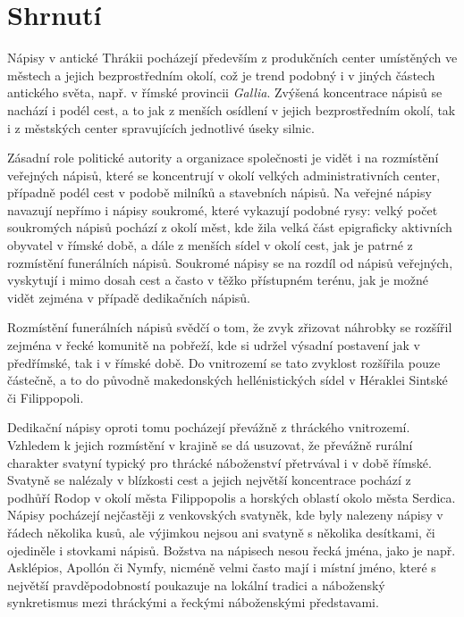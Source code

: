 \section[shrnutí-25]{Shrnutí}

Nápisy v antické Thrákii pocházejí především z produkčních center umístěných ve městech a jejich bezprostředním okolí, což je trend podobný i v jiných částech antického světa, např. v římské provincii {\em Gallia}. Zvýšená koncentrace nápisů se nachází i podél cest, a to jak z menších osídlení v jejich bezprostředním okolí, tak i z městských center spravujících jednotlivé úseky silnic.

Zásadní role politické autority a organizace společnosti je vidět i na rozmístění veřejných nápisů, které se koncentrují v okolí velkých administrativních center, případně podél cest v podobě milníků a stavebních nápisů. Na veřejné nápisy navazují nepřímo i nápisy soukromé, které vykazují podobné rysy: velký počet soukromých nápisů pochází z okolí měst, kde žila velká část epigraficky aktivních obyvatel v římské době, a dále z menších sídel v okolí cest, jak je patrné z rozmístění funerálních nápisů. Soukromé nápisy se na rozdíl od nápisů veřejných, vyskytují i mimo dosah cest a často v těžko přístupném terénu, jak je možné vidět zejména v případě dedikačních nápisů.

Rozmístění funerálních nápisů svědčí o tom, že zvyk zřizovat náhrobky se rozšířil zejména v řecké komunitě na pobřeží, kde si udržel výsadní postavení jak v předřímské, tak i v římské době. Do vnitrozemí se tato zvyklost rozšířila pouze částečně, a to do původně makedonských hellénistických sídel v Héraklei Sintské či Filippopoli.

Dedikační nápisy oproti tomu pocházejí převážně z thráckého vnitrozemí. Vzhledem k jejich rozmístění v krajině se dá usuzovat, že převážně rurální charakter svatyní typický pro thrácké náboženství přetrvával i v době římské. Svatyně se nalézaly v blízkosti cest a jejich největší koncentrace pochází z podhůří Rodop v okolí města Filippopolis a horských oblastí okolo města Serdica. Nápisy pocházejí nejčastěji z venkovských svatyněk, kde byly nalezeny nápisy v řádech několika kusů, ale výjimkou nejsou ani svatyně s několika desítkami, či ojediněle i stovkami nápisů. Božstva na nápisech nesou řecká jména, jako je např. Asklépios, Apollón či Nymfy, nicméně velmi často mají i místní jméno, které s největší pravděpodobností poukazuje na lokální tradici a náboženský synkretismus mezi thráckými a řeckými náboženskými představami.

